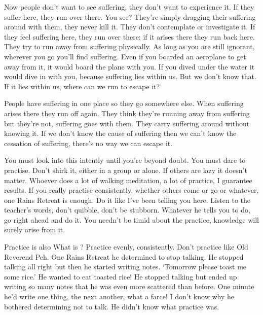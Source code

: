Now people don't want to see suffering, they don't want to experience it. If they suffer here, they run over there. You see? They're simply dragging their suffering around with them, they never kill it. They don't contemplate or investigate it. If they feel suffering here, they run over there; if it arises there they run back here. They try to run away from suffering physically. As long as you are still ignorant, wherever you go you'll find suffering. Even if you boarded an aeroplane to get away from it, it would board the plane with you. If you dived under the water it would dive in with you, because suffering lies within us. But we don't know that. If it lies within us, where can we run to escape it? 

People have suffering in one place so they go somewhere else. When suffering arises there they run off again. They think they're running away from suffering but they're not, suffering goes with them. They carry suffering around without knowing it. If we don't know the cause of suffering then we can't know the cessation of suffering, there's no way we can escape it. 

You must look into this intently until you're beyond doubt. You must dare to practise. Don't shirk it, either in a group or alone. If others are lazy it doesn't matter. Whoever does a lot of walking meditation, a lot of practice, I guarantee results. If you really practise consistently, whether others come or go or whatever, one Rains Retreat is enough. Do it like I've been telling you here. Listen to the teacher's words, don't quibble, don't be stubborn. Whatever he tells you to do, go right ahead and do it. You needn't be timid about the practice, knowledge will surely arise from it. 

Practice is also  What is ? Practice evenly, consistently. Don't practice like Old Reverend Peh. One Rains Retreat he determined to stop talking. He stopped talking all right but then he started writing notes. `Tomorrow please toast me some rice.' He wanted to eat toasted rice! He stopped talking but ended up writing so many notes that he was even more scattered than before. One minute he'd write one thing, the next another, what a farce! I don't know why he bothered determining not to talk. He didn't know what practice was. 

